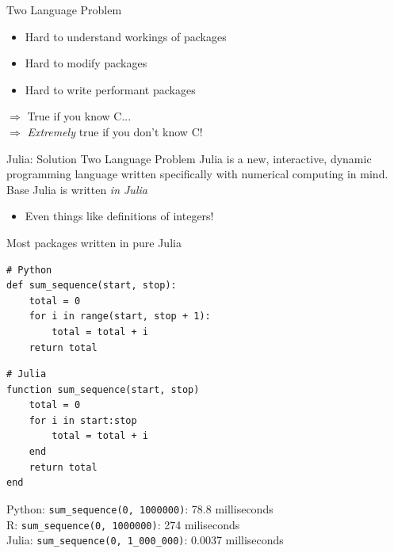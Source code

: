 \documentclass[11pt]{beamer}
\begin{document}
\begin{frame}[c]{Two Language Problem}
\begin{itemize}
    \pause \item Hard to \alert{understand} workings of packages
    \pause \item Hard to \alert{modify} packages
    \pause \item Hard to \alert{write} performant packages
\end{itemize}
\pause
\vspace*{1cm}
$\Rightarrow$ True if you know C... \\
\pause $\Rightarrow$ \emph{Extremely} true if you don't know C!
\end{frame}

\begin{frame}[c]{Julia: Solution Two Language Problem}
Julia is a new, interactive, dynamic programming language written specifically with numerical computing in mind. \\
\vspace{0.2cm}
Base Julia is written \emph{in Julia}
\begin{itemize}
    \item Even things like definitions of integers!
\end{itemize}
Most packages written in pure Julia
\end{frame}

\begin{frame}[fragile, t]{}
\begin{verbatim}
# Python
def sum_sequence(start, stop):
    total = 0
    for i in range(start, stop + 1):
        total = total + i
    return total
\end{verbatim}
\begin{verbatim}
# Julia
function sum_sequence(start, stop)
    total = 0
    for i in start:stop
        total = total + i
    end
    return total
end
    \end{verbatim}
\pause
Python: \texttt{sum\_sequence(0, 1000000)}: 78.8 milliseconds\\
R: \texttt{sum\_sequence(0, 1000000)}: 274 miliseconds \\
Julia: \texttt{sum\_sequence(0, 1\_000\_000)}: 0.0037 milliseconds
\end{frame}
\end{document}
